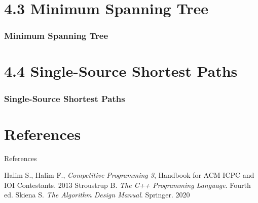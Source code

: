 \documentclass{beamer}
\begin{document}
\section{4.3 Minimum Spanning Tree}

\begin{frame}[fragile]
\frametitle{Minimum Spanning Tree}

\end{frame}


\section{4.4 Single-Source Shortest Paths}

\begin{frame}[fragile]
\frametitle{Single-Source Shortest Paths}

\end{frame}



\section*{References}
\begin{frame}{References}
    \begin{thebibliography}{}
         Halim S., Halim F., \textit{Competitive Programming 3}, Handbook for ACM ICPC and IOI Contestants. 2013
         Stroustrup B. \textit{The C++ Programming Language}. Fourth ed. 
         Skiena S. \textit{The Algorithm Design Manual}. Springer. 2020
    \end{thebibliography}
\end{frame}
\end{document}
